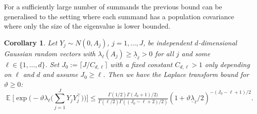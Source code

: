 \documentclass[preprint,aos]{imsart}
\numberwithin{equation}{section}
\newtheorem{corollary}[satz]{Corollary}
\theoremstyle{remark}
\DeclareMathOperator{\E}{{\mathbb E}}
\DeclareMathOperator{\PP}{{\mathbb P}}
\renewcommand{\theta}{\vartheta}
\providecommand{\ceil}[1]{\lceil #1 \rceil}
\renewcommand{\le}{\leqslant}
\renewcommand{\ge}{\geqslant}
\begin{document}
\begin{appendix}
For a sufficiently large number of summands the previous bound can be generalised to the setting where each summand has a population covariance where only the size of the eigenvalue is lower bounded.

\begin{corollary}\label{CorEigenvalueLB}
Let $Y_j\sim N(0,A_j)$, $j=1,\ldots,J$, be independent $d$-dimensional Gaussian random vectors with $\lambda_\ell(A_j)\ge\underline\lambda_\ell>0$ for all $j$ and some $\ell\in\{1,\ldots,d\}$. Set $J_0:=\ceil{J/C_{d,\ell}}$ with a fixed constant $C_{d,\ell}>1$ only depending on $\ell$ and $d$  and assume $J_0\ge \ell$. Then  we have
the Laplace transform bound for $\theta\ge 0$:
\[ \E\Big[\exp\Big(-\theta \lambda_{\ell}\Big(\sum_{j=1}^JY_jY_j^\top\Big)\Big)\Big]\le \tfrac{ \Gamma(1/2)\Gamma(J_0+1)/2)} {\Gamma(\ell/2)\Gamma((J_0-\ell+2)/2)} (1+\theta\underline\lambda_\ell/2)^{-(J_0-\ell+1)/2}.
\]
\end{corollary}


\end{appendix}
\end{document}
